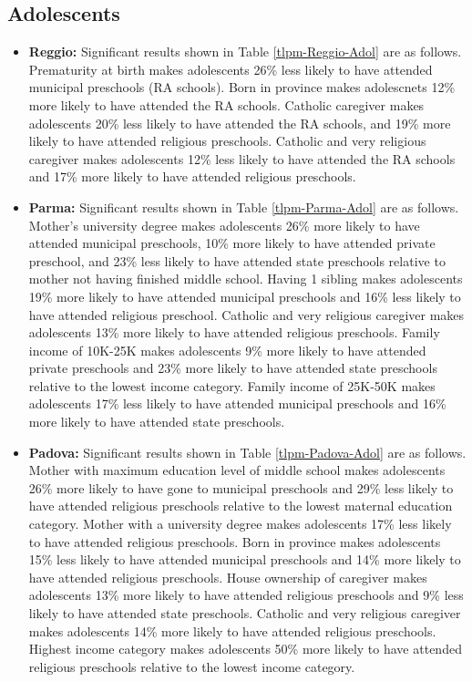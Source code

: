 \documentclass[12pt]{article}
\begin{document}
\subsection{Adolescents}
\begin{itemize}
\item \textbf{Reggio:} Significant results shown in Table \ref{tlpm-Reggio-Adol} are as follows. Prematurity at birth makes adolescents 26\% less likely to have attended municipal preschools (RA schools). Born in province makes adolescnets 12\% more likely to have attended the RA schools. Catholic caregiver makes adolescents 20\% less likely to have attended the RA schools, and 19\% more likely to have attended religious preschools. Catholic and very religious caregiver makes adolescents 12\% less likely to have attended the RA schools and 17\% more likely to have attended religious preschools. 
\item \textbf{Parma:} Significant results shown in Table \ref{tlpm-Parma-Adol} are as follows. Mother's university degree makes adolescents 26\% more likely to have attended municipal preschools, 10\% more likely to have attended private preschool, and 23\% less likely to have attended state preschools relative to mother not having finished middle school. Having 1 sibling makes adolescents 19\% more likely to have attended municipal preschools and 16\% less likely to have attended religious preschool. Catholic and very religious caregiver makes adolescents 13\% more likely to have attended religious preschools. Family income of 10K-25K makes adolescents 9\% more likely to have attended private preschools and 23\% more likely to have attended state preschools relative to the lowest income category. Family income of 25K-50K makes adolescents 17\% less likely to have attended municipal preschools and 16\% more likely to have attended state preschools.
\item \textbf{Padova:} Significant results shown in Table \ref{tlpm-Padova-Adol} are as follows. Mother with maximum education level of middle school makes adolescents 26\% more likely to have gone to municipal preschools and 29\% less likely to have attended religious preschools relative to the lowest maternal education category. Mother with a university degree makes adolescents 17\% less likely to have attended religious preschools. Born in province makes adolescents 15\% less likely to have attended municipal preschools and 14\% more likely to have attended religious preschools. House ownership of caregiver makes adolescents 13\% more likely to have attended religious preschools and 9\% less likely to have attended state preschools. Catholic and very religious caregiver makes adolescents 14\% more likely to have attended religious preschools. Highest income category makes adolescents 50\% more likely to have attended religious preschools relative to the lowest income category.
\end{itemize}
\end{document}

